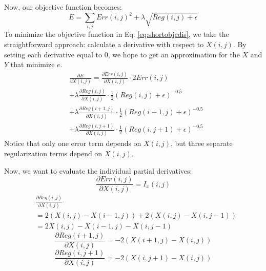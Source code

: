 \documentclass[10pt,twocolumn,letterpaper]{article}
\begin{document}
Now, our objective function becomes:
\begin{equation} \label{eq:shortobjcdis}
E = \sum_{i,j} Err(i,j)^2 + \lambda \sqrt{Reg(i,j) + \epsilon }
\end{equation}
To minimize the objective function in Eq. \ref{eq:shortobjcdis}, we take the straightforward approach: calculate a derivative with respect to $X(i, j)$.  By setting each derivative equal to $0$, we hope to get an approximation for the $X$ and $Y$ that minimize $e$.
\begin{equation}
\begin{aligned}
&\frac{\partial E}{\partial X(i, j)} = \frac{\partial Err(i,j)}{\partial X(i, j)} \cdot 2 Err(i, j) \\
&+ \lambda \frac{\partial Reg(i,j)}{\partial X(i, j)} \cdot \frac{1}{2} (Reg(i, j) + \epsilon)^{-0.5}  \\
&+ \lambda \frac{\partial Reg(i+1,j)}{\partial X(i, j)} \cdot \frac{1}{2} (Reg(i+1, j) + \epsilon)^{-0.5}  \\
&+ \lambda \frac{\partial Reg(i,j+1)}{\partial X(i, j)} \cdot \frac{1}{2} (Reg(i, j+1) + \epsilon)^{-0.5}
\end{aligned}
\label{eq:dedx}
\end{equation}
Notice that only one error term depends on $X(i, j)$, but three separate regularization terms depend on $X(i, j)$.

Now, we want to evaluate the individual partial derivatives:
\begin{equation} \label{eq:derrdx}
\frac{\partial Err(i,j)}{\partial X(i, j)} = I_x(i, j)
\end{equation}
\begin{equation} \label{eq:dreg1dx}
\begin{aligned}
&\frac{\partial Reg(i,j)}{\partial X(i, j)} \\
&= 2(X(i, j) - X(i-1, j)) + 2(X(i, j) - X(i, j-1)) \\
&= 2X(i,j) - X(i-1, j) - X(i,j-1)
\end{aligned}
\end{equation}
\begin{equation} \label{eq:dreg2dx}
\frac{\partial Reg(i+1,j)}{\partial X(i, j)} = -2(X(i+1,j) - X(i,j))
\end{equation}
\begin{equation} \label{eq:dreg3dx}
\frac{\partial Reg(i,j+1)}{\partial X(i, j)} = -2(X(i,j+1) - X(i,j))
\end{equation}
\end{document}
